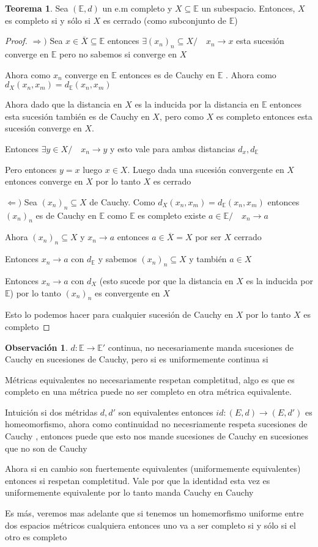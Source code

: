\documentclass[12pt]{article}
\newcommand{\E}{\mathbb{E}}
\newcommand{\Ra}{\Rightarrow}
\newcommand{\ra}{\rightarrow}
\newcommand{\ol}{\overline}
\theoremstyle{definition}
\newtheorem*{remark}{Observación}
\newtheorem{theorem}{Teorema}
\begin{document}
\begin{theorem}
  Sea $(\E,d)$ un e.m completo y $X \subseteq \E$ un subespacio. Entonces, $X$ es completo si y sólo si $X$ es cerrado (como subconjunto de $\E$)
  \begin{proof}
  $\Ra ) $ Sea $x \in \ol X \subseteq \E$ entonces $\exists (x_n)_n \subseteq X / \quad x_n \ra x$ esta sucesión converge en $\E$ pero no sabemos si converge en $X$

Ahora como $x_n$ converge en $\E$ entonces es de Cauchy en $\E$ . Ahora como $d_X(x_n,x_m) = d_{\E}(x_n,x_m)$

Ahora dado que la distancia en $X$ es la inducida por la distancia en $\E$ entonces esta sucesión también es de Cauchy en $X$, pero como $X$ es completo entonces esta sucesión converge en $X$.

Entonces $\exists y \in X / \quad x_n \ra y$ y esto vale para ambas distancias $d_x,d_{\E}$

Pero entonces $y = x $ luego $x \in X$. Luego dada una sucesión convergente en $X$ entonces converge en $X$ por lo tanto $X$ es cerrado

$\Leftarrow )$ Sea $(x_n)_n \subseteq X$ de Cauchy. Como $d_X(x_n,x_m) = d_{\E}(x_n,x_m)$ entonces $(x_n)_n$ es de Cauchy en $\E$ como $\E$ es completo existe $a \in \E/ \quad x_n \ra a$

Ahora $(x_n)_n \subseteq X$ y $x_n \ra a$ entonces $a \in \ol X = X$ por ser $X$ cerrado

Entonces $x_n \ra a$ con $d_{\E}$ y sabemos $(x_n)_n \subseteq X$ y también $a \in X$ 

Entonces $x_n \ra a$ con $d_X$ (esto sucede por que la distancia en $X$ es la inducida por $\E$) por lo tanto $(x_n)_n$ es convergente en $X$

Esto lo podemos hacer para cualquier sucesión de Cauchy en $X$ por lo tanto $X$ es completo
  \end{proof}
\end{theorem}
\begin{remark}
  $d: \E \ra \E '$ continua, no necesariamente manda sucesiones de Cauchy en sucesiones de Cauchy, pero si es uniformemente continua si

  Métricas equivalentes no necesariamente respetan completitud, algo es que es completo en una métrica puede no ser completo en otra métrica equivalente.
  
  Intuición si dos métridas $d,d'$ son equivalentes entonces $id: (E,d) \ra (E,d')$ es homeomorfismo, ahora como continuidad no necesriamente respeta sucesiones de Cauchy , entonces puede que esto nos mande sucesiones de Cauchy en sucesiones que no son de Cauchy

  Ahora si en cambio son fuertemente equivalentes (uniformemente equivalentes) entonces si respetan completitud. Vale por que la identidad esta vez es uniformemente equivalente por lo tanto manda Cauchy en Cauchy

  Es más, veremos mas adelante que si tenemos un homemorfismo uniforme entre dos espacios métricos cualquiera entonces uno va a ser completo si y sólo si el otro es completo 
\end{remark}
\end{document}
